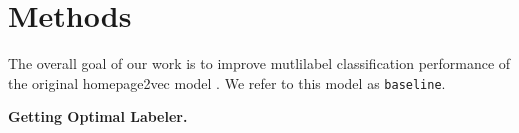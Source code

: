 \section{Methods}\label{sec:methods}

The overall goal of our work is to improve mutlilabel classification performance of the original homepage2vec model \cite{homepage2vec}. We refer to this model as \texttt{baseline}. 



\textbf{Getting Optimal Labeler.} %




